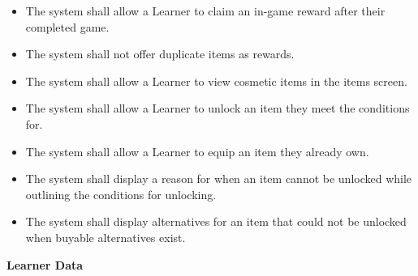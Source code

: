 \documentclass[12pt]{article}
\newcounter{reqnumR} %
\begin{document}
\noindent \begin{itemize}
  \setcounter{reqnumR}{0}

  \item[\refstepcounter{reqnumR}\thereqnumR \label{FR-RWD-1}:] The system shall allow a Learner to claim an in-game reward after their completed game.

  \item[\refstepcounter{reqnumR}\thereqnumR \label{FR-RWD-2}:] The system shall not offer duplicate items as rewards.

  \item[\refstepcounter{reqnumR}\thereqnumR \label{FR-RWD-3}:] The system shall allow a Learner to view cosmetic items in the items screen.

  \item[\refstepcounter{reqnumR}\thereqnumR \label{FR-RWD-4}:] The system shall allow a Learner to unlock an item they meet the conditions for.

  \item[\refstepcounter{reqnumR}\thereqnumR \label{FR-RWD-5}:] The system shall allow a Learner to equip an item they already own.

  \item[\refstepcounter{reqnumR}\thereqnumR \label{FR-RWD-6}:] The system shall display a reason for when an item cannot be unlocked while outlining the conditions for unlocking.

  \item[\refstepcounter{reqnumR}\thereqnumR \label{FR-RWD-7}:] The system shall display alternatives for an item that could not be unlocked when buyable alternatives exist.
\end{itemize}

\noindent \textbf{Learner Data}
\end{document}
